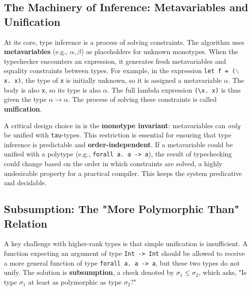 \subsection{The Machinery of Inference: Metavariables and Unification}
At its core, type inference is a process of solving constraints. The algorithm uses \textbf{metavariables} (e.g., $\alpha, \beta$) as placeholders for unknown monotypes. When the typechecker encounters an expression, it generates fresh metavariables and equality constraints between types. For example, in the expression \texttt{let f = ($\backslash$ x. x)}, the type of \texttt{x} is initially unknown, so it is assigned a metavariable $\alpha$. The body is also \texttt{x}, so its type is also $\alpha$. The full lambda expression \texttt{(\textbackslash x. x)} is thus given the type $\alpha \to \alpha$. The process of solving these constraints is called \textbf{unification}.

A critical design choice in \cite{jones-practical-2007} is the \textbf{monotype invariant}: metavariables can \textit{only} be unified with \texttt{tau}-types. This restriction is essential for ensuring that type inference is predictable and \textbf{order-independent}. If a metavariable could be unified with a polytype (e.g., \texttt{forall a. a -> a}), the result of typechecking could change based on the order in which constraints are solved, a highly undesirable property for a practical compiler. This keeps the system predicative and decidable.

\subsection{Subsumption: The "More Polymorphic Than" Relation}
A key challenge with higher-rank types is that simple unification is insufficient. A function expecting an argument of type \texttt{Int -> Int} should be allowed to receive a more general function of type \texttt{forall a. a -> a}, but these two types do not unify. The solution is \textbf{subsumption}, a check denoted by $\sigma_1 \le \sigma_2$, which asks, "Is type $\sigma_1$ at least as polymorphic as type $\sigma_2$?"


